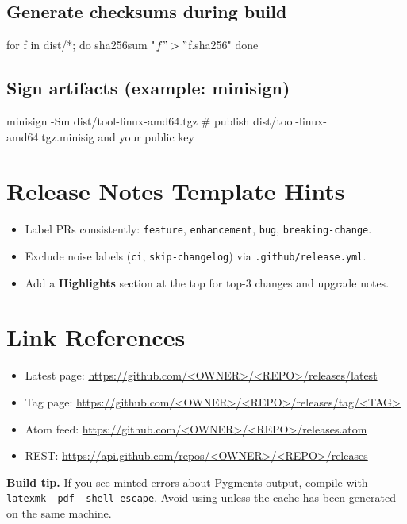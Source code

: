 \documentclass[11pt]{article}
\newcommand{\key}[1]{\texttt{#1}}
\newcommand{\file}[1]{\texttt{#1}}
\begin{document}
\subsection*{Generate checksums during build}
\begin{bashcode}
for f in dist/*; do
  sha256sum "$f" > "$f.sha256"
done
\end{bashcode}

\subsection*{Sign artifacts (example: minisign)}
\begin{bashcode}
minisign -Sm dist/tool-linux-amd64.tgz
# publish dist/tool-linux-amd64.tgz.minisig and your public key
\end{bashcode}

\section{Release Notes Template Hints}
\begin{itemize}
  \item Label PRs consistently: \key{feature}, \key{enhancement}, \key{bug}, \key{breaking-change}.
  \item Exclude noise labels (\key{ci}, \key{skip-changelog}) via \file{.github/release.yml}.
  \item Add a \textbf{Highlights} section at the top for top-3 changes and upgrade notes.
\end{itemize}

\section{Link References}
\begin{itemize}
  \item Latest page: \url{https://github.com/<OWNER>/<REPO>/releases/latest}
  \item Tag page: \url{https://github.com/<OWNER>/<REPO>/releases/tag/<TAG>}
  \item Atom feed: \url{https://github.com/<OWNER>/<REPO>/releases.atom}
  \item REST: \url{https://api.github.com/repos/<OWNER>/<REPO>/releases}
\end{itemize}

\vfill
\begin{tcolorbox}
\textbf{Build tip.} If you see minted errors about Pygments output, compile with \file{latexmk -pdf -shell-escape}. Avoid using \key{} unless the cache has been generated on the same machine.
\end{tcolorbox}
\end{document}
